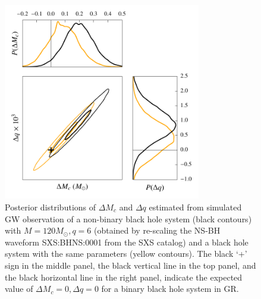 \documentclass[prd,preprintnumbers,twocolumn,eqsecnum,floatfix,a4paper,nofootinbib,superscriptaddress]{revtex4}
\begin{document}
\begin{figure}[htb] 
\begin{center}
\includegraphics[width=3.4in]{figs/posteriors_BBH_rescaled_NSBH.pdf}
\end{center} 
\caption{Posterior distributions of $\Delta M_c$ and $\Delta q$ estimated from simulated GW observation of a non-binary black hole system (black contours) with $M = 120 M_\odot, q = 6$ (obtained by re-scaling the NS-BH waveform SXS:BHNS:0001 from the SXS catalog) and a black hole system with the same parameters (yellow contours). The black `+' sign in the middle panel, the black vertical line in the top panel, and the black horizontal line in the right panel, indicate the expected value of $\Delta M_c = 0, \Delta q = 0$ for a binary black hole system in GR.} 
\label{fig:non_bbh_posterior}
\end{figure}
\end{document}
